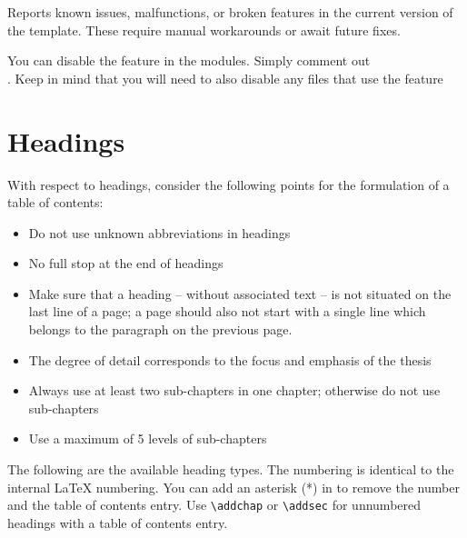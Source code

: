 \begin{bugbox}
    Reports known issues, malfunctions, or broken features in the current version of the template. These require manual workarounds or await future fixes.
\end{bugbox}



You can disable the feature in the modules. Simply comment out\\ \verb||. Keep in mind that you will need to also disable any files that use the feature

\section{Headings}
With respect to headings, consider the following points for the formulation of a table of contents:
\begin{itemize}
    \item Do not use unknown abbreviations in headings
    \item No full stop at the end of headings
    \item Make sure that a heading -- without associated text -- is not situated on the last line of a page; a page should also not start with a single line which belongs to the paragraph on the previous page.
    \item The degree of detail corresponds to the focus and emphasis of the thesis
    \item Always use at least two sub-chapters in one chapter; otherwise do not use sub-chapters
    \item Use a maximum of 5 levels of sub-chapters
\end{itemize}

The following are the available heading types. The numbering is identical to the internal \LaTeX{} numbering. You can add an asterisk (*) in to remove the number and the table of contents entry. Use \verb*|\addchap| or \verb*|\addsec| for unnumbered headings with a table of contents entry.


